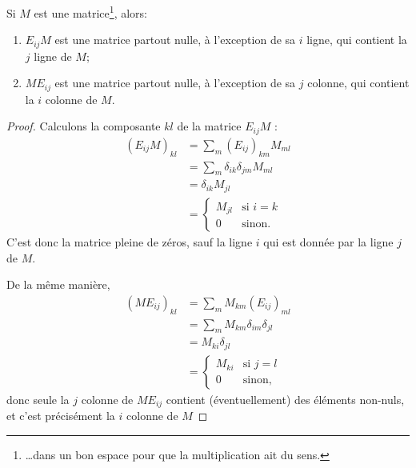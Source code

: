 \begin{lemma}   \label{LEM_multiplicationMatriceEij}
  Si \( M \) est une matrice\footnote{\dots dans un bon espace pour que la multiplication ait du sens.}, alors:
  \begin{enumerate}
      \item
          \( E_{ij}M \) est une matrice partout nulle, à l'exception de sa \( i \)\ieme{} ligne, qui contient la \( j \)\ieme{} ligne de \( M \);
      \item
          \( ME_{ij} \) est une matrice partout nulle, à l'exception de sa \( j \)\ieme{} colonne, qui contient la \( i \)\ieme{} colonne de \( M \).
  \end{enumerate}
\end{lemma}

\begin{proof}
    Calculons la composante \( kl\) de la matrice \( E_{ij}M\) :
    \begin{subequations}
        \begin{align}
            (E_{ij}M)_{kl}&=\sum_m(E_{ij})_{km}M_{ml}\\
            &=\sum_m\delta_{ik}\delta_{jm}M_{ml}\\
            &=\delta_{ik}M_{jl}\\
            &=
            \begin{cases}
            M_{jl} &\text{si } i=k\\
            0 & \text{sinon}.
            \end{cases}
        \end{align}
    \end{subequations}
    C'est donc la matrice pleine de zéros, sauf la ligne \( i\) qui est donnée par la ligne \( j\) de \( M\).

    De la même manière,
    \begin{subequations}
        \begin{align}
            (ME_{ij})_{kl}&=\sum_mM_{km}(E_{ij})_{ml}\\
            &=\sum_mM_{km}\delta_{im}\delta_{jl}\\
            &=M_{ki}\delta_{jl}\\
            &=
            \begin{cases}
            M_{ki} &\text{si } j=l\\
            0 & \text{sinon},
            \end{cases}
        \end{align}
    \end{subequations}
    donc seule la \( j\) \ieme{} colonne de \(ME_{ij}\) contient (éventuellement) des éléments non-nuls, et c'est précisément la \( i \)\ieme{} colonne de \( M \)
\end{proof}


